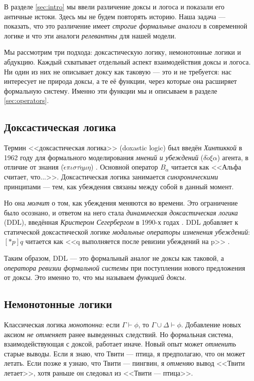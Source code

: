 \documentclass[12pt,a4paper]{article}
\begin{document}
В разделе \ref{sec:intro} мы ввели различение доксы и логоса и показали его античные истоки. Здесь
мы не будем повторять историю. Наша задача --- показать, что это различение имеет
\emph{строгие формальные аналоги} в современной логике и что эти аналоги
\emph{релевантны} для нашей модели.

Мы рассмотрим три подхода: доксастическую логику, немонотонные логики и абдукцию.
Каждый схватывает отдельный аспект взаимодействия доксы и логоса. Ни один из них
не описывает доксу как таковую --- это и не требуется: нас интересует не природа
доксы, а те её функции, через которые она расширяет формальную систему. Именно эти
функции мы и описываем в разделе \ref{sec:operators}.

\subsection{Доксастическая логика}
\label{sec:doxastic}

Термин <<доксастическая логика>> (doxastic logic) был введён \emph{Хинтиккой} в
1962 году для формального моделирования \emph{мнений и убеждений}
($\delta\acute{o}\xi\alpha$) агента, в отличие от знания
($\grave{\epsilon}\pi\iota\sigma\tau\acute{\eta}\mu\eta$) \cite{hintikka}. Основной оператор
$B_\alpha$ читается как <<Альфа считает, что...>>. Доксастическая логика занимается
\emph{синхроническими} принципами --- тем, как убеждения связаны между собой в данный
момент.

Но она \emph{молчит} о том, как убеждения меняются во времени. Это ограничение было
осознано, и ответом на него стала \emph{динамическая доксастическая логика} (DDL),
введённая \emph{Кристером Сегербергом} в 1990-х годах \cite{segerberg01}. DDL добавляет к статической
доксастической логике \emph{модальные операторы изменения убеждений}:
$[*p]q$ читается как <<q выполняется после ревизии убеждений на p>> \cite{segerberg10}.

Таким образом, DDL --- это формальный аналог не доксы как таковой, а
\emph{оператора ревизии формальной системы} при поступлении нового предложения
от доксы. Это именно то, что мы называем \emph{функцией доксы}.

\subsection{Немонотонные логики}
\label{sec:nonmonotonic}

Классическая логика \emph{монотонна}: если
$\Gamma \vdash \phi$, то $\Gamma \cup \Delta \vdash \phi$. Добавление новых аксиом
\emph{не отменяет} ранее выведенных следствий. Но формальная система, взаимодействующая
с доксой, работает иначе. Новый опыт может \emph{отменить} старые выводы. Если я знаю,
что Твити --- птица, я предполагаю, что он может летать. Если позже я узнаю, что
Твити --- пингвин, я \emph{отменяю} вывод <<Твити летает>>, хотя раньше он следовал
из <<Твити --- птица>>.
\end{document}
